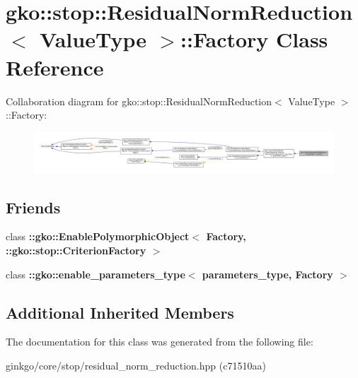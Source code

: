 \hypertarget{classgko_1_1stop_1_1ResidualNormReduction_1_1Factory}{}\section{gko\+:\+:stop\+:\+:Residual\+Norm\+Reduction$<$ Value\+Type $>$\+:\+:Factory Class Reference}
\label{classgko_1_1stop_1_1ResidualNormReduction_1_1Factory}


Collaboration diagram for gko\+:\+:stop\+:\+:Residual\+Norm\+Reduction$<$ Value\+Type $>$\+:\+:Factory\+:
\nopagebreak
\begin{figure}[H]
\begin{center}
\leavevmode
\includegraphics[width=350pt]{classgko_1_1stop_1_1ResidualNormReduction_1_1Factory__coll__graph}
\end{center}
\end{figure}
\subsection*{Friends}
\begin{DoxyCompactItemize}
\item 
\mbox{\label{classgko_1_1stop_1_1ResidualNormReduction_1_1Factory_aaa5507cf00e5361a77971746fefa42e6}} 
class {\bfseries \+::gko\+::\+Enable\+Polymorphic\+Object$<$ Factory, \+::gko\+::stop\+::\+Criterion\+Factory $>$}
\item 
\mbox{\label{classgko_1_1stop_1_1ResidualNormReduction_1_1Factory_a0d176cbd42d6214e11aee8c30ca256fc}} 
class {\bfseries \+::gko\+::enable\+\_\+parameters\+\_\+type$<$ parameters\+\_\+type, Factory $>$}
\end{DoxyCompactItemize}
\subsection*{Additional Inherited Members}


The documentation for this class was generated from the following file\+:\begin{DoxyCompactItemize}
\item 
ginkgo/core/stop/residual\+\_\+norm\+\_\+reduction.\+hpp (c71510aa)\end{DoxyCompactItemize}
